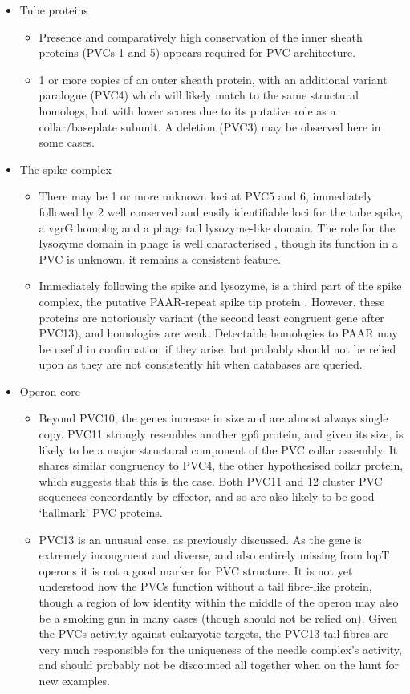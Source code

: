 \begin{itemize}
	\item{Tube proteins}
	\begin{itemize}
		\item Presence and comparatively high conservation of the inner sheath proteins (PVCs 1 and 5) appears required for PVC architecture.
		\item 1 or more copies of an outer sheath protein, with an additional variant paralogue (PVC4) which will likely match to the same structural homologs, but with lower scores due to its putative role as a collar/baseplate subunit. A deletion (PVC3) may be observed here in some cases.
	\end{itemize}
	\item{The spike complex}
	\begin{itemize}
		\item There may be 1 or more unknown loci at PVC5 and 6, immediately followed by 2 well conserved and easily identifiable loci for the tube spike, a vgrG homolog and a phage tail lysozyme-like domain. The role for the lysozyme domain in phage is well characterised \citep{Arisaka2003}, though its function in a PVC is unknown, it remains a consistent feature.
		\item Immediately following the spike and lysozyme, is a third part of the spike complex, the putative PAAR-repeat spike tip protein \citep{Shneider2013}. However, these proteins are notoriously variant (the second least congruent gene after PVC13), and homologies are weak. Detectable homologies to PAAR may be useful in confirmation if they arise, but probably should not be relied upon as they are not consistently hit when databases are queried.
	\end{itemize}
\item{Operon core}
	\begin{itemize}
	\item Beyond PVC10, the genes increase in size and are almost always single copy. PVC11 strongly resembles another gp6 protein, and given its size, is likely to be a major structural component of the PVC collar assembly. It shares similar congruency to PVC4, the other hypothesised collar protein, which suggests that this is the case. Both PVC11 and 12 cluster PVC sequences concordantly by effector, and so are also likely to be good `hallmark' PVC proteins.
	\item PVC13 is an unusual case, as previously discussed. As the gene is extremely incongruent and diverse, and also entirely missing from lopT operons it is not a good marker for PVC structure. It is not yet understood how the PVCs function without a tail fibre-like protein, though a region of low identity within the middle of the operon may also be a smoking gun in many cases (though should not be relied on). Given the PVCs activity against eukaryotic targets, the PVC13 tail fibres are very much responsible for the uniqueness of the needle complex's activity, and should probably not be discounted all together when on the hunt for new examples.

\end{itemize}
\end{itemize}
